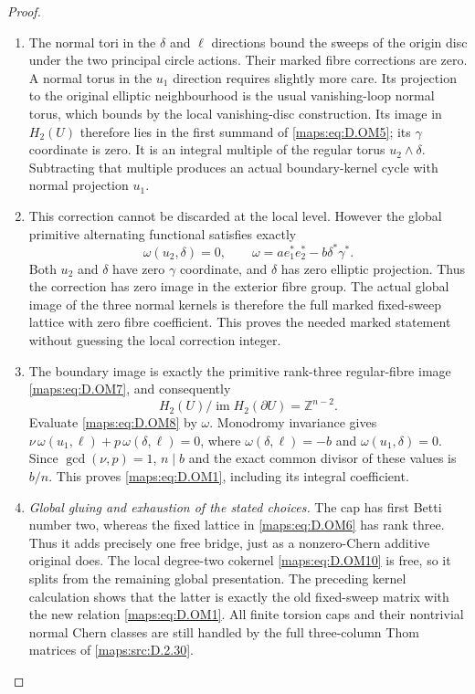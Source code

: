 \begin{proof}
\begin{enumerate}[label=\arabic*.,leftmargin=*]
\item The normal tori in the $\delta$ and $\ell$ directions
bound the sweeps of the origin disc under the two
principal circle actions. Their marked fibre corrections
are zero. A normal torus in the $u_1$ direction requires
slightly more care. Its projection to the original
elliptic neighbourhood is the usual vanishing-loop
normal torus, which bounds by the local vanishing-disc
construction. Its image in $H_2(U)$ therefore lies in
the first summand of \eqref{maps:eq:D.OM5}; its $\gamma$ coordinate
is zero. It is an integral multiple of the regular
torus $u_2\wedge\delta$. Subtracting that multiple
produces an actual boundary-kernel cycle with normal
projection $u_1$.

\item This correction cannot be discarded at the local level.
However the global primitive alternating functional
satisfies exactly
\[
 \omega(u_2,\delta)=0,\qquad
 \omega=a e_1^*e_2^*-b\delta^*\gamma^*.                    \tag{D.OM9}\label{maps:eq:D.OM9}
\]
Both $u_2$ and $\delta$ have zero $\gamma$ coordinate,
and $\delta$ has zero elliptic projection. Thus the
correction has zero image in the exterior fibre group.
The actual global image of the three normal kernels is
therefore the full marked fixed-sweep lattice with
zero fibre coefficient. This proves the needed marked
statement without guessing the local correction integer.

\item The boundary image is exactly the primitive rank-three
regular-fibre image \eqref{maps:eq:D.OM7}, and consequently
\[
 H_2(U)/\operatorname{im}H_2(\partial U)
                          =\mathbb Z^{n-2}.               \tag{D.OM10}\label{maps:eq:D.OM10}
\]
Evaluate \eqref{maps:eq:D.OM8} by $\omega$. Monodromy invariance gives
$\nu\,\omega(u_1,\ell)+p\,\omega(\delta,\ell)=0$,
where $\omega(\delta,\ell)=-b$ and
$\omega(u_1,\delta)=0$. Since $\gcd(\nu,p)=1$,
$n\mid b$ and the exact common divisor of these values
is $b/n$. This proves \eqref{maps:eq:D.OM1}, including its integral
coefficient.

\item \emph{Global gluing and exhaustion of the stated choices.}
The cap has first Betti number two, whereas the fixed
lattice in \eqref{maps:eq:D.OM6} has rank three. Thus it adds precisely
one free bridge, just as a nonzero-Chern additive original
does. The local degree-two cokernel \eqref{maps:eq:D.OM10} is free,
so it splits from the remaining global presentation.
The preceding kernel calculation shows that the latter
is exactly the old fixed-sweep matrix with the new
relation \eqref{maps:eq:D.OM1}. All finite torsion caps and their
nontrivial normal Chern classes are still handled by
the full three-column Thom matrices of \ref{maps:src:D.2.30}.


\end{enumerate}
\end{proof}
